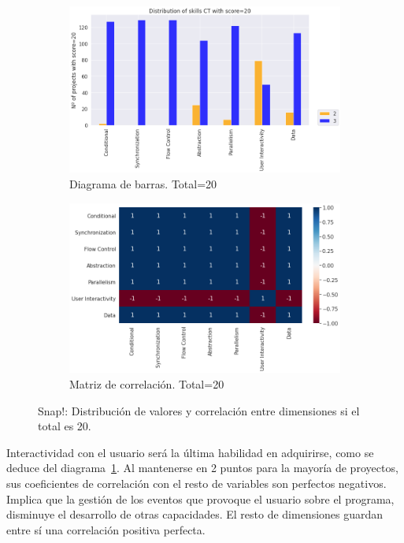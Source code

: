 \documentclass[a4paper, 12pt]{book}
\begin{document}
\begin{figure}[H]
    \centering
    \begin{subfigure}[h]{.49\textwidth} 
        \includegraphics[width=\textwidth]{img/distribucion_20_Snap}
        \caption{Diagrama de barras. Total=20}
        \label{fig:total20_Snap}
    \end{subfigure}       
    \begin{subfigure}[h]{.49\textwidth} 
        \includegraphics[width=\textwidth]{img/corr_20_Snap}
        \caption{Matriz de correlación. Total=20}
        \label{fig:corr20_Snap}
    \end{subfigure}
    \caption{Snap!: Distribución de valores y correlación entre dimensiones si el total es 20.}
\end{figure}

Interactividad con el usuario será la última habilidad en adquirirse, como se deduce del diagrama~\ref{fig:total20_Snap}. Al mantenerse en 2 puntos para la mayoría de proyectos, sus coeficientes de correlación con el resto de variables son perfectos negativos. Implica que la gestión de los eventos que provoque el usuario sobre el programa, disminuye el desarrollo de otras capacidades. El resto de dimensiones guardan entre sí una correlación positiva perfecta.
\end{document}
